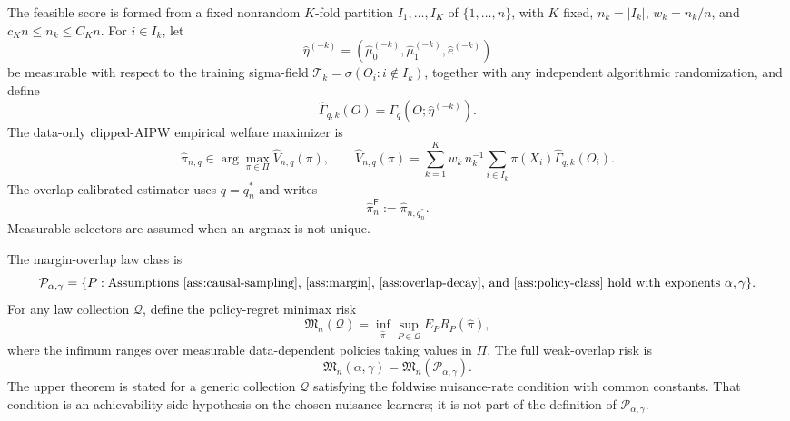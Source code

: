 \documentclass[11pt]{article}
\theoremstyle{definition}
\theoremstyle{plain}
\theoremstyle{remark}
\begin{document}
The feasible score is formed from a fixed nonrandom \(K\)-fold partition
\(I_1,\ldots,I_K\) of \(\{1,\ldots,n\}\), with \(K\) fixed,
\(n_k=|I_k|\), \(w_k=n_k/n\), and \(c_Kn\le n_k\le C_Kn\).  For
\(i\in I_k\), let
\[
\widehat\eta^{(-k)}=(\widehat\mu_0^{(-k)},\widehat\mu_1^{(-k)},
\widehat e^{(-k)})
\]
be measurable with respect to the training sigma-field
\(\mathcal T_k=\sigma(O_i:i\notin I_k)\), together with any independent
algorithmic randomization, and define
\[
\widehat\Gamma_{q,k}(O)=\Gamma_q(O;\widehat\eta^{(-k)}).
\]
The data-only clipped-AIPW empirical welfare maximizer is
\[
\widehat\pi_{n,q}\in\arg\max_{\pi\in\Pi}
\widehat V_{n,q}(\pi),\qquad
\widehat V_{n,q}(\pi)=
\sum_{k=1}^K w_k\, n_k^{-1}\sum_{i\in I_k}
\pi(X_i)\widehat\Gamma_{q,k}(O_i).
\]
The overlap-calibrated estimator uses \(q=q_n^*\) and writes
\[
\widehat\pi_{n}^{\mathsf F}:=\widehat\pi_{n,q_n^*}.
\]
Measurable selectors are assumed when an argmax is not unique.

The margin-overlap law class is
\[
\mathcal P_{\alpha,\gamma}
=\{P:\text{Assumptions~\ref{ass:causal-sampling},
\ref{ass:margin}, \ref{ass:overlap-decay}, and
\ref{ass:policy-class} hold with exponents }\alpha,\gamma\}.
\]
For any law collection \(\mathcal Q\), define the policy-regret minimax risk
\[
\mathfrak M_n(\mathcal Q)
=\inf_{\widehat\pi}
\sup_{P\in\mathcal Q}E_P R_P(\widehat\pi),
\]
where the infimum ranges over measurable data-dependent policies taking
values in \(\Pi\).  The full weak-overlap risk is
\[
\mathfrak M_n(\alpha,\gamma)=\mathfrak M_n(\mathcal P_{\alpha,\gamma}).
\]
The upper theorem is stated for a generic collection \(\mathcal Q\) satisfying
the foldwise nuisance-rate condition with common constants.  That condition
is an achievability-side hypothesis on the chosen nuisance learners; it is
not part of the definition of \(\mathcal P_{\alpha,\gamma}\).
\end{document}
